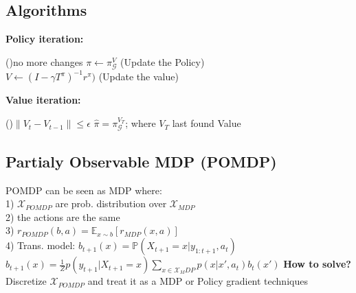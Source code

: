 \subsection{Algorithms}
\textbf{Policy iteration:}\\
\begin{algorithm}[H]
    \While(){no more changes}{
        $\pi \gets \pi_\mathcal{G}^{V}$ (Update the Policy)\\
        $V \gets (I-\gamma T^\pi)^{-1}r^\pi)$ (Update the value)
    }
\end{algorithm}
\textbf{Value iteration:}\\
    \begin{algorithm}[H]
        \While(){$\left\lVert  V_t - V_{t-1}\right\rVert \leq \epsilon$}{
        }
        $\hat{\pi} = \pi_\mathcal{G}^{V_T}$; where $V_T$ last found Value
\end{algorithm}
\subsection{Partialy Observable MDP (POMDP)}
POMDP can be seen as MDP where:\\
1) $\mathcal{X}_{POMDP}$ are prob. distribution over $\mathcal{X}_{MDP}$\\
2) the actions are the same\\
3) $r_{POMDP}(b, a)= \mathbb{E}_{x\sim b}\left[r_{MDP}(x, a)\right]$\\
4) Trans. model: $b_{t+1}(x) = \mathbb{P}(X_{t+1}=x\vert y_{1:t+1}, a_t)$\\
$b_{t+1}(x) = \frac{1}{Z}p(y_{t+1}\vert X_{t+1}=x)\sum_{x\in \mathcal{X}_MDP}p(x\vert x', a_t)b_t(x')$
\textbf{How to solve?} Discretize $\mathcal{X}_{POMDP}$ and treat it as a MDP or Policy gradient techniques